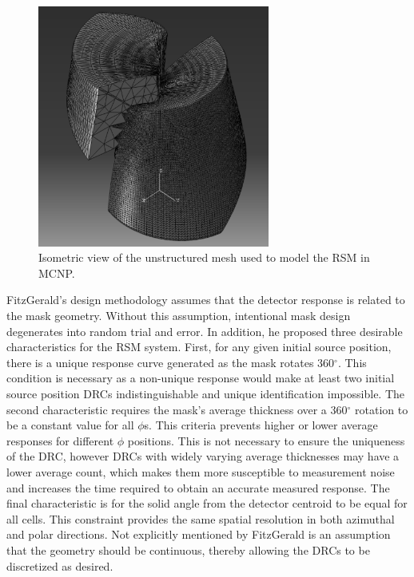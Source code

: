 \documentclass[3p,times]{elsarticle}
\begin{document}
\begin{figure}[ht!]
\includegraphics[width={3.0in}]{../figs/P2AtIso.pdf}
\centering
\caption{Isometric view of the unstructured mesh used to model the RSM in MCNP.}
\label{fig:RSM}
\end{figure}

FitzGerald's design methodology assumes that the detector response is related to the mask geometry.  
Without this assumption, intentional mask design degenerates into random trial and error.
In addition, he proposed three desirable characteristics for the RSM system.  
First, for any given initial source position, there is a unique response curve generated as the mask rotates 360$^\circ$.  
This condition is necessary as a non-unique response would make at least two initial source position DRCs indistinguishable and unique identification impossible.
The second characteristic requires the mask's average thickness over a 360$^\circ$ rotation to be a constant value for all $\phi$s.  
This criteria prevents higher or lower average responses for different $\phi$ positions. 
This is not necessary to ensure the uniqueness of the DRC, however DRCs with widely varying average thicknesses may have a lower average count, which makes them more susceptible to measurement noise and increases the time required to obtain an accurate measured response.
The final characteristic is for the solid angle from the detector centroid to be equal for all cells.  
This constraint provides the same spatial resolution in both azimuthal and polar directions.
Not explicitly mentioned by FitzGerald is an assumption that the geometry should be continuous, thereby allowing the DRCs to be discretized as desired.
\end{document}
